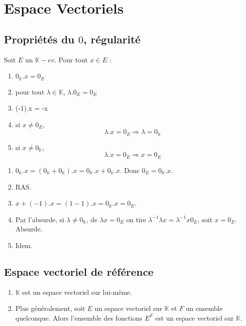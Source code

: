 \documentclass[../main.tex]{subfiles}
\begin{document}
\setcounter{chapter}{19}
\chapter{Espace Vectoriels}
\tableofcontents
\clearpage

\section{Propriétés du $0$, régularité}
\begin{tcolorbox}[title=Propostion 20.2, title filled=false, colframe=lightblue, colback=lightblue!10!white]
    Soit $E$ un $\mathbb{K}-ev$. Pour tout $x \in E$ :
    \begin{enumerate}
        \item $0_{\mathbb{K}}.x = 0_E$
        \item pour tout $\lambda \in \mathbb{K}$, $\lambda.0_E = 0_E$
        \item (-1).x = -x
        \item si $x\neq 0_E$, $$\lambda.x = 0_E \Rightarrow \lambda = 0_{\mathbb{K}}$$
        \item si $x\neq 0_{\mathbb{K}}$, $$\lambda.x = 0_E \Rightarrow x = 0_E$$
    \end{enumerate}
\end{tcolorbox}

\begin{enumerate}
    \item $0_{\mathbb{K}}.x = (0_{\mathbb{K}} + 0_{\mathbb{K}}).x = 0_{\mathbb{K}}.x + 0_{\mathbb{K}}.x$. Donc $0_E = 0_{\mathbb{K}}.x$.
    \item RAS. 
    \item $x + (-1).x = (1 - 1).x = 0_{\mathbb{K}}.x = 0_E$.
    \item Par l'absurde, si $\lambda \neq 0_{\mathbb{K}}$, de $\lambda x = 0_E$ on tire $\lambda^{-1} \lambda x = \lambda^{-1} x 0_E$, soit $x = 0_E$. Absurde. 
    \item Idem. 
\end{enumerate}

\section{Espace vectoriel de référence}
\begin{tcolorbox}[title=Propostion 20.10, title filled=false, colframe=lightblue, colback=lightblue!10!white]
    \begin{enumerate}
        \item $\mathbb{K}$ est un espace vectoriel sur lui-même. 
        \item Plus généralement, soit $E$ un espace vectoriel sur $\mathbb{K}$ et $F$ un ensemble quelconque. Alors l'ensemble des fonctions $E^F$ est un espace vectoriel sur $\mathbb{K}$.
    \end{enumerate}
\end{tcolorbox}
\end{document}
